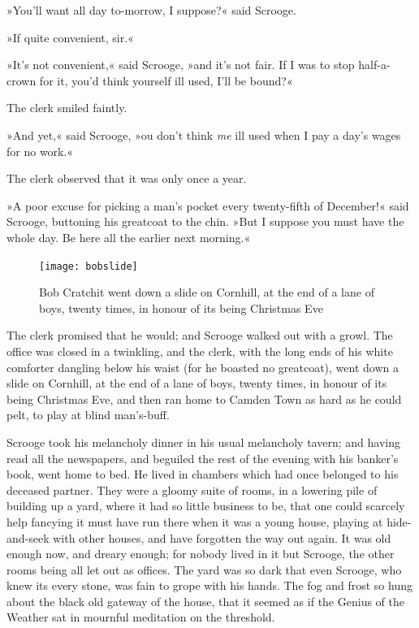 »You'll want all day to-morrow, I suppose?« said Scrooge.

»If quite convenient, sir.«

»It's not convenient,« said Scrooge, »and it's not fair. If I was to stop half-a-crown for it, you'd think yourself ill used, I'll be bound?«

The clerk smiled faintly.

»And yet,« said Scrooge, »ou don't think \textit{me} ill used when I pay a day's wages for no work.«

The clerk observed that it was only once a year.

»A poor excuse for picking a man's pocket every twenty-fifth of December!« said Scrooge, buttoning his greatcoat to the chin. »But I suppose you must have the whole day. Be here all the earlier next morning.«

\begin{figure}[p]
\begin{minipage}[c]{\textwidth}
\texttt{[image: bobslide]}
\caption[\textbf{Bob Cratchit went down a slide}]{Bob Cratchit went down a slide on Cornhill, at the end of a lane of boys, twenty times, in honour of its being Christmas Eve}
\end{minipage}
\end{figure}

The clerk promised that he would; and Scrooge walked out with a growl. The office was closed in a twinkling, and the clerk, with the long ends of his white comforter dangling below his waist (for he boasted no greatcoat), went down a slide on Cornhill, at the end of a lane of boys, twenty times, in honour of its being Christmas Eve, and then ran home to Camden Town as hard as he could pelt, to play at blind man's-buff.

Scrooge took his melancholy dinner in his usual melancholy tavern; and having read all the newspapers, and beguiled the rest of the evening with his banker's book, went home to bed. He lived in chambers which had once belonged to his deceased partner. They were a gloomy suite of rooms, in a lowering pile of building up a yard, where it had so little business to be, that one could scarcely help fancying it must have run there when it was a young house, playing at hide-and-seek with other houses, and have forgotten the way out again. It was old enough now, and dreary enough; for nobody lived in it but Scrooge, the other rooms being all let out as offices. The yard was so dark that even Scrooge, who knew its every stone, was fain to grope with his hands. The fog and frost so hung about the black old gateway of the house, that it seemed as if the Genius of the Weather sat in mournful meditation on the threshold.

